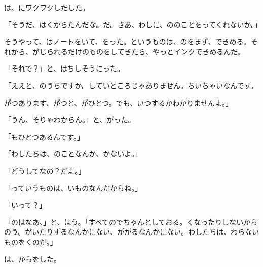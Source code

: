 は、にワクワクしだした。

「そうだ、はくからたんだな。だ。さあ、わしに、ののことをってくれないか。」

そうやって、はノートをいて、をった。というものは、のをまず、できめる。それから、がじられるだけのものをしてきたら、やっとインクできめるんだ。

「それで？」と、はちしそうにった。

「ええと、のうちですか。していところじゃありません。ちいちゃいなんです。

がつあります、がつと、がひとつ。でも、いつするかわかりませんよ。」

「うん、そりゃわからん。」と、がった。

「もひとつあるんです。」

「わしたちは、のことなんか、かないよ。」

「どうしてなの？だよ。」

「っていうものは、いものなんだからね。」

「いって？」

「のはなあ、」と、はう。「すべてのでちゃんとしておる。くなったりしないからのう。がいたりするなんかにない、ががるなんかにない。わしたちは、わらないものをくのだ。」

は、からをした。

